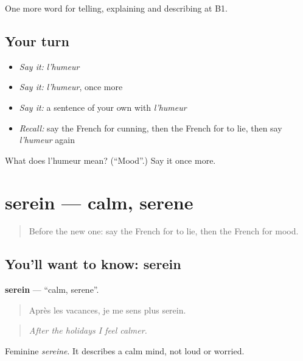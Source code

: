 \begin{grammarlens}[title={What you've built}]
One more word for telling, explaining and describing at B1.
\end{grammarlens}

\subsection*{Your turn}
\begin{itemize}
\raggedright
  \item \emph{Say it:} \emph{l'humeur}
  \item \emph{Say it:} \emph{l'humeur}, once more
  \item \emph{Say it:} a sentence of your own with \emph{l'humeur}
  \item \emph{Recall:} say the French for cunning, then the French for to lie, then say \emph{l'humeur} again
\end{itemize}

\begin{tcolorbox}[breakable,colback=teal!4,colframe=teal!35!black,title={Before you move on}]
What does l'humeur mean? (\textquotedblleft{}Mood\textquotedblright{}.) Say it once more.
\end{tcolorbox}
\section[serein]{serein — calm, serene}

\label{lesson:FR-C469-serein}



\begin{quote}
Before the new one: say the French for to lie, then the French for mood.
\end{quote}

\subsection*{You'll want to know: serein}
\textbf{serein} — \textquotedblleft{}calm, serene\textquotedblright{}.

\begin{quote}
Après les vacances, je me sens plus serein.
\end{quote}

\begin{quote}
\emph{After the holidays I feel calmer.}
\end{quote}

Feminine \emph{sereine}. It describes a calm mind, not loud or worried.

